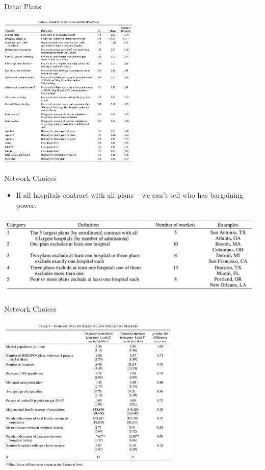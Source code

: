 \documentclass[xcolor=pdftex,dvipsnames,table,mathserif,aspectratio=169]{beamer}
\begin{document}
\begin{frame}{Data: Plans}
\begin{center}
\includegraphics[height=7.5cm]{./resources/ho_table2.png}
\end{center}
\end{frame}

\begin{frame}{Network Choices}
\begin{itemize}
\item If all hospitals contract with all plans -- we can't tell who has bargaining power.\\
\end{itemize}
\includegraphics[height=4cm]{./resources/ho_fig1a.png}
\end{frame}



\begin{frame}{Network Choices}
\begin{center}
\includegraphics[height=7.5cm]{./resources/ho_table3.png}
\end{center}
\end{frame}
\end{document}
